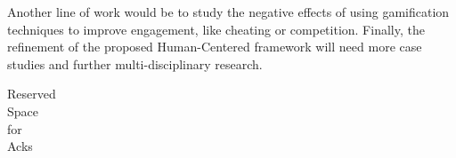Another line of work would be to study the negative effects of using 
gamification techniques to improve engagement, like cheating or competition.
Finally, the refinement of the proposed Human-Centered framework will need
more case studies and further multi-disciplinary research. 



\begin{acks}

  Reserved\\
  Space\\
  for\\
  Acks

\end{acks}
